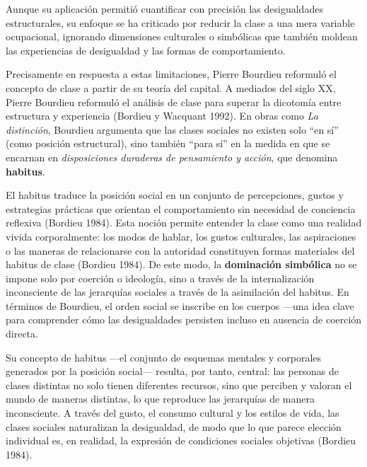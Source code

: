 \documentclass[
  spanish,
  letterpaper,
  DIV=11,
  numbers=noendperiod]{scrreprt}
\begin{document}
Aunque su aplicación permitió cuantificar con precisión las
desigualdades estructurales, su enfoque se ha criticado por reducir la
clase a una mera variable ocupacional, ignorando dimensiones culturales
o simbólicas que también moldean las experiencias de desigualdad y las
formas de comportamiento.

Precisamente en respuesta a estas limitaciones, Pierre Bourdieu
reformuló el concepto de clase a partir de su teoría del capital. A
mediados del siglo XX, Pierre Bourdieu reformuló el análisis de clase
para superar la dicotomía entre estructura y experiencia (Bordieu y
Wacquant 1992). En obras como \emph{La distinción}, Bourdieu argumenta
que las clases sociales no existen solo ``en sí'' (como posición
estructural), sino también ``para sí'' en la medida en que se encarnan
en \emph{disposiciones duraderas de pensamiento y acción}, que denomina
\textbf{habitus}.

El habitus traduce la posición social en un conjunto de percepciones,
gustos y estrategias prácticas que orientan el comportamiento sin
necesidad de conciencia reflexiva (Bordieu 1984). Esta noción permite
entender la clase como una realidad vivida corporalmente: los modos de
hablar, los gustos culturales, las aspiraciones o las maneras de
relacionarse con la autoridad constituyen formas materiales del habitus
de clase (Bordieu 1984). De este modo, la \textbf{dominación simbólica}
no se impone solo por coerción o ideología, sino a través de la
internalización inconsciente de las jerarquías sociales a través de la
asimilación del habitus. En términos de Bourdieu, el orden social se
inscribe en los cuerpos ---una idea clave para comprender cómo las
desigualdades persisten incluso en ausencia de coerción directa.

Su concepto de habitus ---el conjunto de esquemas mentales y corporales
generados por la posición social--- resulta, por tanto, central: las
personas de clases distintas no solo tienen diferentes recursos, sino
que perciben y valoran el mundo de maneras distintas, lo que reproduce
las jerarquías de manera inconsciente. A través del gusto, el consumo
cultural y los estilos de vida, las clases sociales naturalizan la
desigualdad, de modo que lo que parece elección individual es, en
realidad, la expresión de condiciones sociales objetivas (Bordieu 1984).
\end{document}
